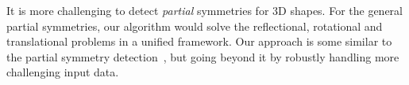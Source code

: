 It is more challenging to detect \emph{partial} symmetries for 3D shapes. For the general partial symmetries, our algorithm would solve the reflectional, rotational and translational problems in a unified framework. Our approach is some similar to the partial symmetry detection~\cite{berner2011}, but going beyond it by robustly handling more challenging input data. 